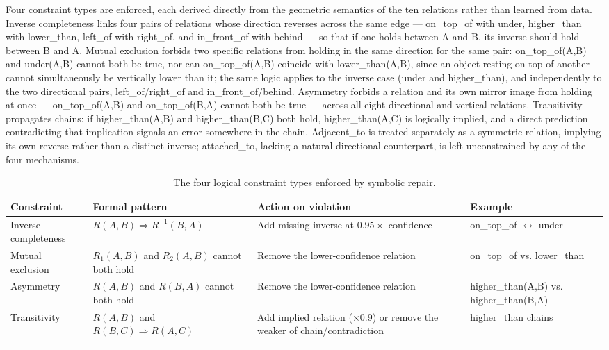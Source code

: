 \documentclass[sn-mathphys,Numbered]{sn-jnl}
\begin{document}
Four constraint types are enforced, each derived directly from the geometric semantics of the ten relations rather than learned from data. Inverse completeness links four pairs of relations whose direction reverses across the same edge --- on\_top\_of with under, higher\_than with lower\_than, left\_of with right\_of, and in\_front\_of with behind --- so that if one holds between A and B, its inverse should hold between B and A. Mutual exclusion forbids two specific relations from holding in the same direction for the same pair: on\_top\_of(A,B) and under(A,B) cannot both be true, nor can on\_top\_of(A,B) coincide with lower\_than(A,B), since an object resting on top of another cannot simultaneously be vertically lower than it; the same logic applies to the inverse case (under and higher\_than), and independently to the two directional pairs, left\_of/right\_of and in\_front\_of/behind. Asymmetry forbids a relation and its own mirror image from holding at once --- on\_top\_of(A,B) and on\_top\_of(B,A) cannot both be true --- across all eight directional and vertical relations. Transitivity propagates chains: if higher\_than(A,B) and higher\_than(B,C) both hold, higher\_than(A,C) is logically implied, and a direct prediction contradicting that implication signals an error somewhere in the chain. Adjacent\_to is treated separately as a symmetric relation, implying its own reverse rather than a distinct inverse; attached\_to, lacking a natural directional counterpart, is left unconstrained by any of the four mechanisms.

\begin{table}[htbp]
\centering
\caption{The four logical constraint types enforced by symbolic repair.}\label{tab7}
\small
\begin{tabular}{@{}p{2cm}p{2.8cm}p{3.2cm}p{2.3cm}@{}}
\toprule
Constraint & Formal pattern & Action on violation & Example \\
\midrule
Inverse completeness & $R(A,B) \Rightarrow R^{-1}(B,A)$ & Add missing inverse at $0.95\times$ confidence & on\_top\_of $\leftrightarrow$ under \\
\midrule
Mutual exclusion & $R_1(A,B)$ and $R_2(A,B)$ cannot both hold & Remove the lower-confidence relation & on\_top\_of vs. lower\_than \\
\midrule
Asymmetry & $R(A,B)$ and $R(B,A)$ cannot both hold & Remove the lower-confidence relation & higher\_than(A,B) vs. higher\_than(B,A) \\
\midrule
Transitivity & $R(A,B)$ and $R(B,C) \Rightarrow R(A,C)$ & Add implied relation ($\times0.9$) or remove the weaker of chain/contradiction & higher\_than chains \\
\botrule
\end{tabular}
\end{table}
\end{document}
